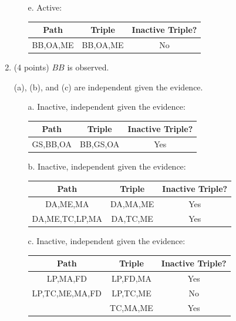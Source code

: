 \documentclass[12pt]{article}
\begin{document}
\begin{enumerate}
\begin{enumerate}
		\item[e.]
		Active:
		\begin{center}
			\begin{tabular}{|c|c|c|}
				\hline
				Path & Triple & Inactive Triple? \\
				\hline
				BB,OA,ME & BB,OA,ME & No \\
				\hline
			\end{tabular}
		\end{center}
	\end{enumerate}

	\item (4 points) $BB$ is observed.

	(a), (b), and (c) are independent given the evidence.

	\begin{enumerate}
		\item[a.]
		Inactive, independent given the evidence:
		\begin{center}
			\begin{tabular}{|c|c|c|}
				\hline
				Path & Triple & Inactive Triple? \\
				\hline
				GS,BB,OA & BB,GS,OA & Yes \\
				\hline
			\end{tabular}
		\end{center}

		\item[b.]
		Inactive, independent given the evidence:
		\begin{center}
			\begin{tabular}{|c|c|c|}
				\hline
				Path & Triple & Inactive Triple? \\
				\hline
				DA,ME,MA & DA,MA,ME & Yes \\
				\hline
				DA,ME,TC,LP,MA & DA,TC,ME & Yes \\
				\hline
			\end{tabular}
		\end{center}

		\item[c.]
		Inactive, independent given the evidence:
		\begin{center}
			\begin{tabular}{|c|c|c|}
				\hline
				Path & Triple & Inactive Triple? \\
				\hline
				LP,MA,FD & LP,FD,MA & Yes \\
				\hline
				LP,TC,ME,MA,FD & LP,TC,ME & No \\
				& TC,MA,ME & Yes \\
				\hline
			\end{tabular}
		\end{center}


\end{enumerate}
\end{enumerate}
\end{document}
